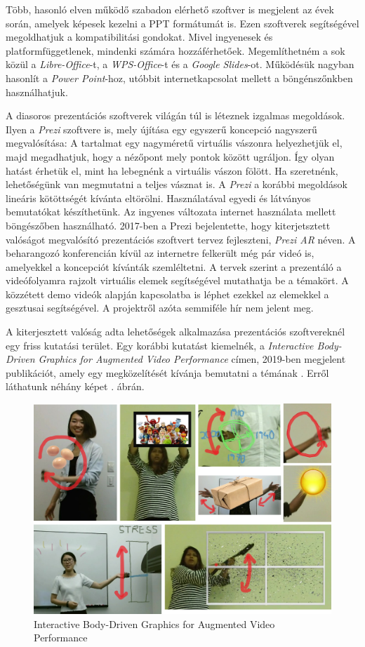 Több, hasonló elven működő szabadon elérhető szoftver is megjelent az évek során, amelyek képesek kezelni a PPT formátumát is. Ezen szoftverek segítségével megoldhatjuk a kompatibilitási gondokat. Mivel ingyenesek és platformfüggetlenek, mindenki számára hozzáférhetőek. Megemlíthetném a sok közül a \textit{Libre-Office}-t, a \textit{WPS-Office}-t és a \textit{Google Slides}-ot. Működésük nagyban hasonlít a \textit{Power Point}-hoz, utóbbit internetkapcsolat mellett a böngénszőnkben használhatjuk.

A diasoros prezentációs szoftverek világán túl is léteznek izgalmas megoldások. 
Ilyen a \textit{Prezi} szoftvere is, mely újítása egy egyszerű koncepció nagyszerű megvalósítása: A tartalmat egy nagyméretű virtuális vászonra helyezhetjük el, majd megadhatjuk, hogy a nézőpont mely pontok között ugráljon. Így olyan hatást érhetük el, mint ha lebegnénk a virtuális vászon fölött. Ha szeretnénk, lehetőségünk van megmutatni a teljes vásznat is. A \textit{Prezi} a korábbi megoldások lineáris kötöttségét kívánta eltörölni. Használatával egyedi és látványos bemutatókat készíthetünk. Az ingyenes változata internet használata mellett böngészőben használható.
2017-ben a Prezi bejelentette, hogy kiterjetsztett valóságot megvalósító prezentációs szoftvert tervez fejleszteni, \textit{Prezi AR} néven. A beharangozó konferencián kívül az internetre felkerült még pár videó is, amelyekkel a koncepciót kívánták szemléltetni. A tervek szerint a prezentáló a videófolyamra rajzolt virtuális elemek segítségével mutathatja be a témakört. A közzétett demo videók alapján kapcsolatba is léphet ezekkel az elemekkel a gesztusai segítségével. A projektről azóta semmiféle hír nem jelent meg.

A kiterjesztett valóság adta lehetőségek alkalmazása prezentációs szoftvereknél egy friss kutatási terület. Egy korábbi kutatást kiemelnék, a \textit{Interactive Body-Driven Graphics for Augmented Video Performance} címen, 2019-ben megjelent publikációt, amely egy megközelítését kívánja bemutatni a témának \cite{saquib2019interactive}. Erről láthatunk néhány képet . ábrán.

\begin{figure}[h]
\centering
\includegraphics[width=\textwidth]{images/IBDGAVP.png}
\caption{Interactive Body-Driven Graphics for Augmented Video Performance}
\label{fig:ibdgavp}
\end{figure}

